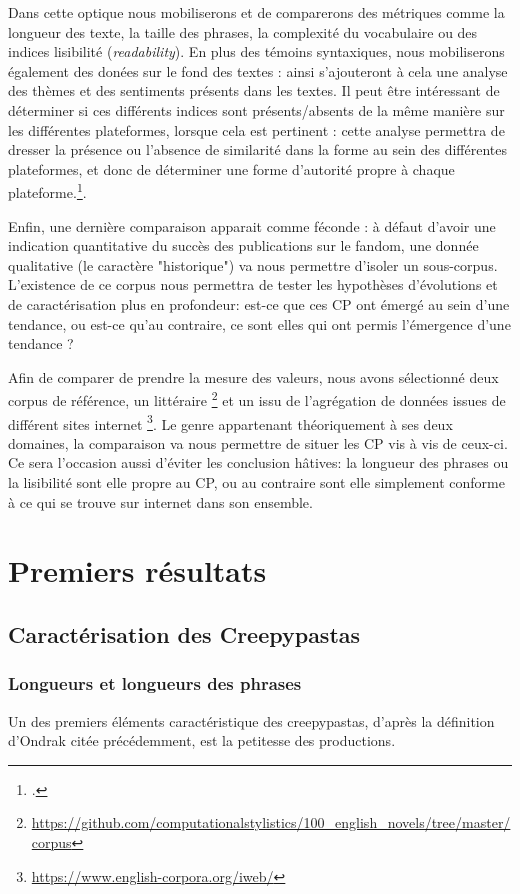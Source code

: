 \documentclass[12pt,a4paper,oneside,titlepage]{book} %
\begin{document}
		Dans cette optique nous mobiliserons et de comparerons des métriques comme la longueur des texte, la taille des phrases, la complexité du vocabulaire ou des indices lisibilité (\textit{readability}). 
		En plus des témoins syntaxiques, nous mobiliserons également des donées sur le fond des textes : ainsi s'ajouteront à cela une analyse des thèmes et des sentiments présents dans les textes.
		Il peut être intéressant de déterminer si ces différents indices sont présents/absents de la même manière sur les différentes plateformes, lorsque cela est pertinent : cette analyse permettra de dresser la présence ou l'absence de similarité dans la forme au sein des différentes plateformes, et donc de déterminer une forme d'autorité propre à chaque plateforme.\footcite{mayer_autorite_2017}. 
	
		Enfin, une dernière comparaison apparait comme féconde : à défaut d'avoir une indication quantitative du succès des publications sur le fandom, une donnée qualitative (le caractère "historique") va nous permettre d'isoler un sous-corpus.  
		L'existence de ce corpus nous permettra de tester les hypothèses d'évolutions et de caractérisation plus en profondeur: est-ce que ces CP ont émergé au sein d'une tendance, ou est-ce qu'au contraire, ce sont elles qui ont permis l'émergence d'une tendance ? 
		
		Afin de comparer de prendre la mesure des valeurs, nous avons sélectionné deux corpus de référence, un littéraire \footnote{\url{https://github.com/computationalstylistics/100_english_novels/tree/master/corpus}} et un issu de l'agrégation de données issues de différent sites internet \footnote{\url{https://www.english-corpora.org/iweb/}}. Le genre appartenant théoriquement à ses deux domaines, la comparaison va nous permettre de situer les CP vis à vis de ceux-ci. Ce sera l'occasion aussi d'éviter les conclusion hâtives: la longueur des phrases ou la lisibilité sont elle propre au CP, ou au contraire sont elle simplement conforme à ce qui se trouve sur internet dans son ensemble.
		
	\part{Premiers résultats}
	
	\chapter{Caractérisation des Creepypastas}
	
	
	\section{Longueurs et longueurs des phrases}
	Un des premiers éléments caractéristique des creepypastas, d'après la définition d'Ondrak citée précédemment, est la petitesse des productions. 
	
\end{document}
